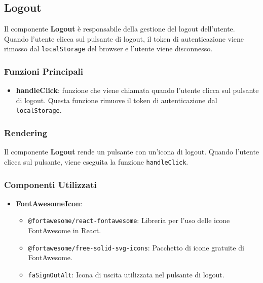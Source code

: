 \documentclass{article}
\begin{document}
\subsection*{Logout}
Il componente \textbf{Logout} è responsabile della gestione del logout dell'utente. Quando l'utente clicca sul pulsante di logout, il token di autenticazione viene rimosso dal \texttt{localStorage} del browser e l'utente viene disconnesso.

\subsubsection*{Funzioni Principali}
\begin{itemize}
    \item \textbf{handleClick}: funzione che viene chiamata quando l'utente clicca sul pulsante di logout. Questa funzione rimuove il token di autenticazione dal \texttt{localStorage}.
\end{itemize}

\subsubsection*{Rendering}
Il componente \textbf{Logout} rende un pulsante con un'icona di logout. Quando l'utente clicca sul pulsante, viene eseguita la funzione \texttt{handleClick}.

\subsubsection*{Componenti Utilizzati}
\begin{itemize}
    \item \textbf{FontAwesomeIcon}:
    \begin{itemize}
        \item \texttt{@fortawesome/react-fontawesome}: Libreria per l'uso delle icone FontAwesome in React.
        \item \texttt{@fortawesome/free-solid-svg-icons}: Pacchetto di icone gratuite di FontAwesome.
        \item \texttt{faSignOutAlt}: Icona di uscita utilizzata nel pulsante di logout.
    \end{itemize}
\end{itemize}
\end{document}

